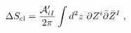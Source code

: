\begin{equation}
\Delta S_{\rm cl}= {{\cal A}_{iI}' \over 2\pi }\int d^2z   
~ \partial Z^i \bar \partial   \bar Z^I  \;,
\end{equation}

